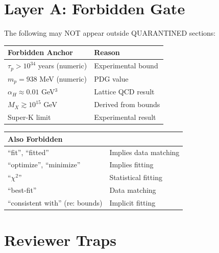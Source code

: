 \documentclass[11pt,a4paper]{article}
\theoremstyle{definition}
\begin{document}
\section{Layer A: Forbidden Gate}
\label{sec:forbidden}

\begin{forbiddenbox}
The following may NOT appear outside QUARANTINED sections:

\begin{center}
\begin{tabular}{ll}
\toprule
Forbidden Anchor & Reason \\
\midrule
$\tau_p > 10^{34}$ years (numeric) & Experimental bound \\
$m_p = 938$ MeV (numeric) & PDG value \\
$\alpha_H \approx 0.01$ GeV$^3$ & Lattice QCD result \\
$M_X \gtrsim 10^{15}$ GeV & Derived from bounds \\
Super-K limit & Experimental result \\
\bottomrule
\end{tabular}
\end{center}

\begin{center}
\begin{tabular}{ll}
\toprule
Also Forbidden & \\
\midrule
``fit'', ``fitted'' & Implies data matching \\
``optimize'', ``minimize'' & Implies fitting \\
``$\chi^2$'' & Statistical fitting \\
``best-fit'' & Data matching \\
``consistent with'' (re: bounds) & Implicit fitting \\
\bottomrule
\end{tabular}
\end{center}
\end{forbiddenbox}

\section{Reviewer Traps}
\label{sec:traps}
\end{document}
